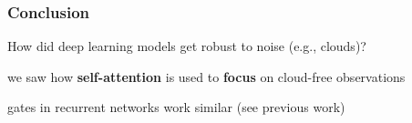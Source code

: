 \documentclass[%
  aspectratio=169,
  9pt,
  USenglish,
  light,
  mathserif,
  professionalfont,
  affiliationintitlepagehead,
  titlegraphic,
   affiliation,
]{beamer}
\begin{document}
{\begin{frame}
	\frametitle{Conclusion}
	\Large
	
	\begin{leftbubbles}
		How did deep learning models get robust to noise {\small (e.g., clouds)}?
	\end{leftbubbles}
	
	\pause
	\begin{rightbubbles}
		we saw how \textbf{self-attention} is used to \textbf{focus} on cloud-free observations
	\end{rightbubbles}
	
	\begin{rightbubbles}
		{gates} in {recurrent networks} work similar {\small (see previous work)}
	\end{rightbubbles}
	

\end{frame}

%
%
%
%
%
%


}	
%
%
%
%
%
%	
%
\end{document}
